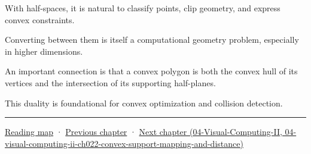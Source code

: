 With half-spaces, it is natural to classify points, clip geometry, and express convex constraints.

Converting between them is itself a computational geometry problem, especially in higher dimensions.

An important connection is that a convex polygon is both the convex hull of its vertices and the intersection of its supporting half-planes.

This duality is foundational for convex optimization and collision detection.

\begin{center}\rule{0.5\linewidth}{0.5pt}\end{center}

\hyperref[volume-reading-map]{Reading map} · \hyperref[03-visual-computing-i-ch020-geometry-queries-from-scene-to-contact]{Previous chapter} · \href{../04-Visual-Computing-II/main.pdf\#nameddest=04-visual-computing-ii-ch022-convex-support-mapping-and-distance}{Next chapter (04-Visual-Computing-II, 04-visual-computing-ii-ch022-convex-support-mapping-and-distance)}
